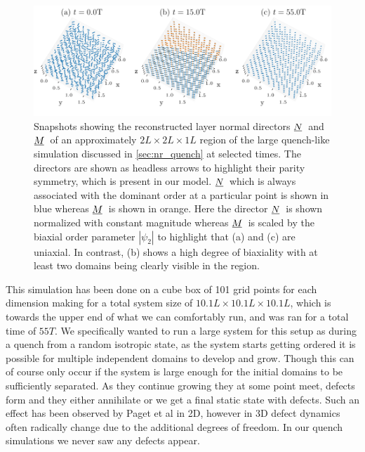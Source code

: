 \documentclass[12pt]{article}
\newcommand{\suf}[2]{\stackunder[0.5pt]{\stackunder[1pt]{\ensuremath{#1}}{\rule{\widthof{\ensuremath{#2}}*\real{0.9}}{.1ex}}}{}}
\newcommand{\su}[1]{\suf{#1}{#1}}
\newcommand{\NN}{\ensuremath{\su{N}}}
\newcommand{\MM}{\ensuremath{\su{M}}}
\begin{document}
        \begin{figure}[t!]
            \begin{center}
                \includegraphics{figures/data_plots/fiso_r7_sample.pdf}
            \end{center}
            \caption{
                Snapshots showing the reconstructed layer normal directors \NN\ and \MM\ of an approximately $2\si{L}\times2\si{L}\times1\si{L}$ region of the large quench-like simulation discussed in \cref{sec:nr_quench} at selected times.
                The directors are shown as headless arrows to highlight their parity symmetry, which is present in our model.
                \NN\ which is always associated with the dominant order at a particular point is shown in blue whereas \MM\ is shown in orange.
                Here the director \NN\ is shown normalized with constant magnitude whereas \MM\ is scaled by the biaxial order parameter $|\psi_2|$ to highlight that (a) and (c) are uniaxial.
                In contrast, (b) shows a high degree of biaxiality with at least two domains being clearly visible in the region.
            }\label{fig:fiso_r7s}
        \end{figure}

        This simulation has been done on a cube box of 101 grid points for each dimension making for a total system size of $10.1\si{L}\times10.1\si{L}\times10.1\si{L}$, which is towards the upper end of what we can comfortably run, and was ran for a total time of $55\si{T}$.
        We specifically wanted to run a large system for this setup as during a quench from a random isotropic state, as the system starts getting ordered it is possible for multiple independent domains to develop and grow.
        Though this can of course only occur if the system is large enough for the initial domains to be sufficiently separated.
        As they continue growing they at some point meet, defects form and they either annihilate or we get a final static state with defects.
        Such an effect has been observed by Paget et al in 2D, however in 3D defect dynamics often radically change due to the additional degrees of freedom.
        In our quench simulations we never saw any defects appear.
    
\end{document}
